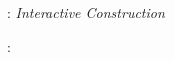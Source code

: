 \thispagestyle{empty}

\hfill

\vfill

\noindent\myName: \newline \emph{Interactive Construction} %
\newline \myTime

\bigskip

\noindent{}: \\
\myProf \\

%
%
%
